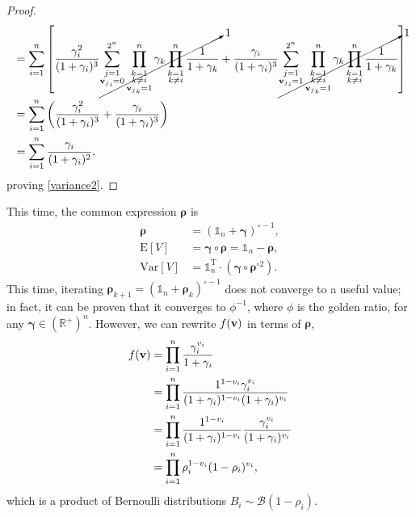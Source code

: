 \documentclass{article}
\newcommand{\0}{\mathbbold{0}}
\newcommand{\1}{\mathds{1}}
\newcommand{\2}{\mathbbold{2}}
\newcommand{\T}{^{\operatorname{T}}}
\begin{document}
\begin{proof}
\begin{align*}
        &= \sum_{i=1}^{n}\left[\frac{\gamma_i^2}{(1+\gamma_i)^3} \cancelto{1}{\sum_{\substack{j=1 \\ {{\bf v}_j}_i = 0}}^{2^n} \prod_{\substack{k=1 \\ k\ne i \\ {{\bf v}_j}_k = 1}}^{n}\gamma_k\prod_{\substack{k=1 \\ k\ne i}}^{n}\frac{1}{1+\gamma_k}} + \frac{\gamma_i}{(1+\gamma_i)^3} \cancelto{1}{\sum_{\substack{j=1 \\ {{\bf v}_j}_i = 1}}^{2^n} \prod_{\substack{k=1 \\ k\ne i \\ {{\bf v}_j}_k = 1}}^{n}\gamma_k\prod_{\substack{k=1 \\ k\ne i}}^{n}\frac{1}{1+\gamma_k}} \right] \\
        &= \sum_{i=1}^{n}\left(\frac{\gamma_i^2}{(1+\gamma_i)^3} + \frac{\gamma_i}{(1+\gamma_i)^3}\right)  \\
        &= \sum_{i=1}^{n}\frac{\gamma_i}{(1+\gamma_i)^2},
    \end{align*}
    proving \eqref{variance2}.
\end{proof}
This time, the common expression ${\boldsymbol \rho}$ is
\begin{align*}
    {\boldsymbol \rho} &= \left(\1_n + {\boldsymbol \gamma}\right)^{\circ -1}, \\
    \text{E}[V] &= {\boldsymbol \gamma} \circ {\boldsymbol \rho} = \1_n - {\boldsymbol \rho}, \\
    \text{Var}[V] &= \1_n\T \cdot \left({\boldsymbol \gamma} \circ {\boldsymbol \rho}^{\circ 2}\right).
\end{align*}
This time, iterating ${\boldsymbol \rho}_{k+1} = \left(\1_n + {\boldsymbol \rho}_k\right)^{\circ -1}$ does not converge to a useful value; in fact, it can be proven that it converges to $\phi^{-1}$, where $\phi$ is the golden ratio, for any ${\boldsymbol \gamma} \in \left(\mathbb{R}^+\right)^n$.
However, we can rewrite $f({\bf v})$ in terms of ${\boldsymbol \rho}$,
\begin{align*}
    f({\bf v}) &= \prod_{i=1}^{n}\frac{\gamma_i^{v_i}}{1+\gamma_i} \\
    &= \prod_{i=1}^{n}\frac{1^{1-v_i}\gamma_i^{v_i}}{(1+\gamma_i)^{1-v_i}(1+\gamma_i)^{v_i}} \\
    &= \prod_{i=1}^{n}\frac{1^{1-v_i}}{(1+\gamma_i)^{1-v_i}}\frac{\gamma_i^{v_i}}{(1+\gamma_i)^{v_i}} \\
    &= \prod_{i=1}^{n}\rho_i^{1-v_i}(1-\rho_i)^{v_i},
\end{align*}
which is a product of Bernoulli distributions $B_i \sim \mathcal{B}(1-\rho_i)$.
\end{document}
